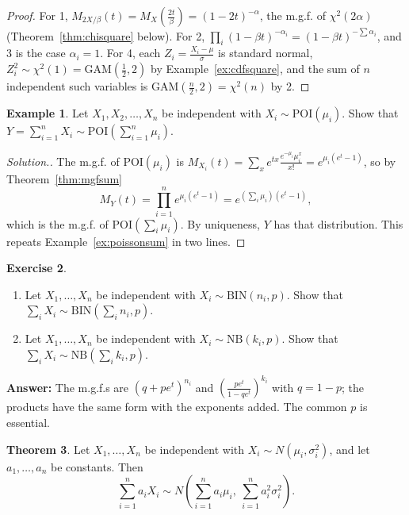 \documentclass[12pt,a4paper]{report}
\theoremstyle{definition}
\newtheorem{thm}{Theorem}[section]
\newtheorem{example}[thm]{Example}
\newtheorem{exe}[thm]{Exercise}
\theoremstyle{plain}
\newenvironment{solution}
  {\renewcommand{\qedsymbol}{}\begin{proof}[\textit{Solution}.]}
  {\end{proof}}
\begin{document}
\begin{proof}
For 1, $M_{2X/\beta}(t) = M_X\left(\frac{2t}{\beta}\right) = (1 -
2t)^{-\alpha}$, the m.g.f. of $\chi^2(2\alpha)$ (Theorem~\ref{thm:chisquare}
below). For 2, $\prod_i(1 - \beta t)^{-\alpha_i} = (1 - \beta t)^{-\sum\alpha_i}$,
and 3 is the case $\alpha_i = 1$. For 4, each
$Z_i = \frac{X_i - \mu}{\sigma}$ is standard normal, $Z_i^2\sim\chi^2(1) =
\text{GAM}\left(\frac12,2\right)$ by Example~\ref{ex:cdfsquare}, and the sum of
$n$ independent such variables is $\text{GAM}\left(\frac n2,2\right) =
\chi^2(n)$ by 2.
\end{proof}

\begin{example}
\label{ex:poissonmgf}
Let $X_1, X_2, \dots, X_n$ be independent with $X_i \sim\text{POI}(\mu_i)$. Show
that $Y = \sum^n_{i = 1} X_i \sim\text{POI}\left(\sum^n_{i = 1} \mu_i\right)$.
\end{example}

\begin{solution}
The m.g.f. of $\text{POI}(\mu_i)$ is
$M_{X_i}(t) = \sum_x e^{tx}\frac{e^{-\mu_i}\mu_i^x}{x!} = e^{\mu_i(e^t - 1)}$, so
by Theorem~\ref{thm:mgfsum}
\[M_Y(t) = \prod^n_{i =1} e^{\mu_i(e^t-1)} = e^{\left(\sum_i\mu_i\right)(e^t -
1)},\]
which is the m.g.f. of $\text{POI}\left(\sum_i\mu_i\right)$. By uniqueness, $Y$
has that distribution. This repeats Example~\ref{ex:poissonsum} in two lines.
\end{solution}

\begin{exe}
\label{exe:binnb}
\begin{enumerate}
\item Let $X_1, \dots , X_n$ be independent with $X_i\sim \text{BIN}(n_i,p)$.
Show that $\sum_i X_i \sim\text{BIN}\left(\sum_i n_i,p\right)$.
\item Let $X_1, \dots, X_n$ be independent with $X_i \sim\text{NB}(k_i,p)$. Show
that $\sum_i X_i \sim\text{NB}\left(\sum_i k_i,p\right)$.
\end{enumerate}

\textbf{Answer:} The m.g.f.s are $(q + pe^t)^{n_i}$ and
$\left(\frac{pe^t}{1 - qe^t}\right)^{k_i}$ with $q = 1 - p$; the products have the
same form with the exponents added. The common $p$ is essential.
\end{exe}

\begin{thm}
\label{thm:normallinear}
Let $X_1, \dots , X_n$ be independent with $X_i \sim N(\mu_i,\sigma_i^2)$, and let
$a_1,\dots,a_n$ be constants. Then
\[\sum^n_{i = 1}a_iX_i \sim N\left(\sum^n_{i = 1} a_i\mu_i,\ \sum^n_{i =
1}a_i^2\sigma^2_i\right).\]
\end{thm}
\end{document}
